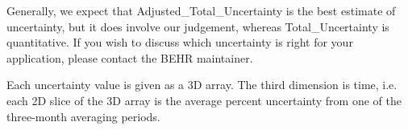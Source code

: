 \documentclass[12pt]{article}
\begin{document}
Generally, we expect that Adjusted\_Total\_Uncertainty is the best estimate of uncertainty, but it does involve our judgement, whereas Total\_Uncertainty is quantitative. If you wish to discuss which uncertainty is right for your application, please contact the BEHR maintainer.

Each uncertainty value is given as a 3D array. The third dimension is time, i.e. each 2D slice of the 3D array is the average percent uncertainty from one of the three-month averaging periods.



\end{document}
